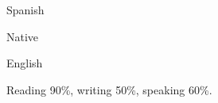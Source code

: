 
\begin{cvskills}

  \cvskill
    {\begin{minipage}[t]{0.1\linewidth}Spanish\end{minipage}} %
    {\begin{minipage}[t]{0.75\linewidth}Native\end{minipage}} %

  \cvskill
    {\begin{minipage}[t]{0.1\linewidth}English\end{minipage}} %
    {\begin{minipage}[t]{0.75\linewidth}Reading 90\%, writing 50\%, speaking 60\%.\end{minipage}} %
    
\end{cvskills}
